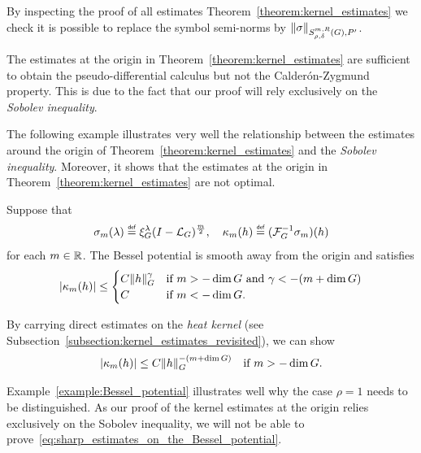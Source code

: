\begin{remark}
\label{remark:right_semi-norms}
    By inspecting the proof of all estimates Theorem~\ref{theorem:kernel_estimates}
    we check it is possible to replace the symbol semi-norms by $\SymbolSemiNorm {m, R} {\rho, \delta} {P'} \sigma$.
\end{remark}

The estimates at the origin in Theorem~\ref{theorem:kernel_estimates} are sufficient to obtain the pseudo-differential calculus but not the Calder\'on-Zygmund property.
This is due to the fact that our proof will rely exclusively on the \emph{Sobolev inequality}.

The following example illustrates very well the relationship between
the estimates around the origin of Theorem~\ref{theorem:kernel_estimates}
and the \emph{Sobolev inequality}.
Moreover, it shows that the estimates at the origin in Theorem~\ref{theorem:kernel_estimates} are not optimal.

\begin{example}
\label{example:Bessel_potential}
    Suppose that
    \begin{align*}
        \sigma_m(\lambda) \defeq \Rep \lambda \BesselPotential m,
        \quad
        \kappa_m(h) \defeq (\InverseFourier \sigma_m)(h)
    \end{align*}
    for each $m \in \R$.
    The Bessel potential is smooth away from the origin and satisfies
    \begin{align*}
        \abs {\kappa_m(h)} \leq
        \begin{cases}
            C \norm [\Group] h^\gamma & \text{if } m > -\dim \Group \text{ and } \gamma < -(m + \dim \Group)\\
            C & \text {if } m < -\dim \Group.
        \end{cases}
    \end{align*}

    By carrying direct estimates on the \emph{heat kernel} (see Subsection~\ref{subsection:kernel_estimates_revisited}),
    we can show
    \begin{align}
        \abs {\kappa_m(h)} \leq C \norm [\Group] h^{-(m + \dim \Group)} \quad \text{if } m > -\dim \Group.
        \label{eq:sharp_estimates_on_the_Bessel_potential}
    \end{align}
\end{example}

\begin{remark}
    Example~\ref{example:Bessel_potential} illustrates well why the case $\rho = 1$ needs to be distinguished.
    As our proof of the kernel estimates at the origin relies exclusively on the Sobolev inequality,
    we will not be able to prove~\eqref{eq:sharp_estimates_on_the_Bessel_potential}.
\end{remark}

